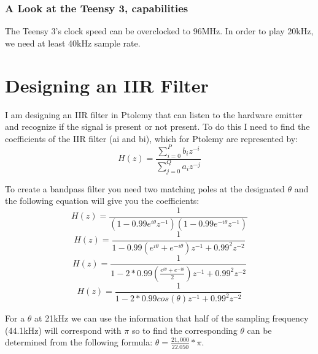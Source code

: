 \documentclass[10pt]{article}
\begin{document}
      \subsubsection{A Look at the Teensy 3, capabilities}
        The Teensy 3's clock speed can be overclocked to 96MHz. In order to play 20kHz, we need at least 40kHz sample rate. 

  \section{Designing an IIR Filter}
    I am designing an IIR filter in Ptolemy that can listen to the hardware emitter and recognize if the signal is present or not present. To do this I need to find the coefficients of the IIR filter (ai and bi), which for Ptolemy are represented by:
      \[H(z) = \frac{\sum_{i=0}^{P} b_i z^{-i}}{\sum_{j=0}^{Q} a_i z^{-j}}\]

    To create a bandpass filter you need two matching poles at the designated \(\theta\) and the following equation will give you the coefficients:
      \[H(z) = \frac{1}{(1 - 0.99e^{i\theta}z^{-1})(1 - 0.99e^{-i\theta}z^{-1})}\]
      \[H(z) = \frac{1}{1 - 0.99(e^{i\theta} + e^{-i\theta})z^{-1} + 0.99^2z^{-2}}\]
      \[H(z) = \frac{1}{1 - 2*0.99(\frac{e^{i\theta} + e^{-i\theta}}{2})z^{-1} + 0.99^2z^{-2}}\]
      \[H(z) = \frac{1}{1 - 2*0.99cos(\theta)z^{-1} + 0.99^2z^{-2}}\]
      
    For a \(\theta\) at 21kHz we can use the information that half of the sampling frequency (44.1kHz) will correspond with \(\pi\) so to find the corresponding \(\theta\) can be determined from the following formula: \(\theta = \frac{21,000}{22.050}*\pi\).
\end{document}
